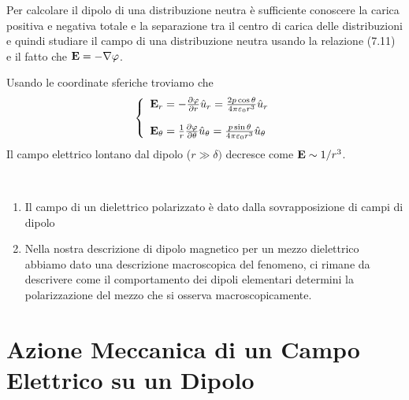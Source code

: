 Per calcolare il dipolo di una distribuzione neutra \`e sufficiente conoscere la carica positiva e negativa totale e la separazione tra il centro di carica delle distribuzioni e quindi studiare il campo di una distribuzione neutra usando la relazione (7.11) e il fatto che $\bold{E} = - \nabla \varphi$. 

Usando le coordinate sferiche troviamo che 
\begin{align*}
\left \{ \begin{array}{l}
	\bold{E}_{r} = - \frac{\partial \varphi}{\partial r} \hat{u}_{r} = \frac{2p \cos\theta}{4 \pi \varepsilon_0 r^3} \hat{u}_{r} \\ \rule{0pt}{20pt}
	\bold{E}_{\theta} = \frac{1}{r} \frac{\partial \varphi}{\partial \theta}\hat{u}_{\theta} = \frac{p \sin \theta}{4 \pi \varepsilon_0 r^3}\hat{u}_{\theta}
\end{array}\right.
\end{align*}
Il campo elettrico lontano dal dipolo ($r \gg \delta)$ decresce come $\bold{E} \sim 1/r^3$. 

\begin{remark}
\
\begin{enumerate}
	\item Il campo di un dielettrico polarizzato \`e dato dalla sovrapposizione di campi di dipolo
	\item Nella nostra descrizione di dipolo magnetico per un mezzo dielettrico abbiamo dato una descrizione macroscopica del fenomeno, ci rimane da descrivere come il comportamento dei dipoli elementari determini la polarizzazione del mezzo che si osserva macroscopicamente.
\end{enumerate}	
\end{remark}

\section{Azione Meccanica di un Campo Elettrico su un Dipolo }

